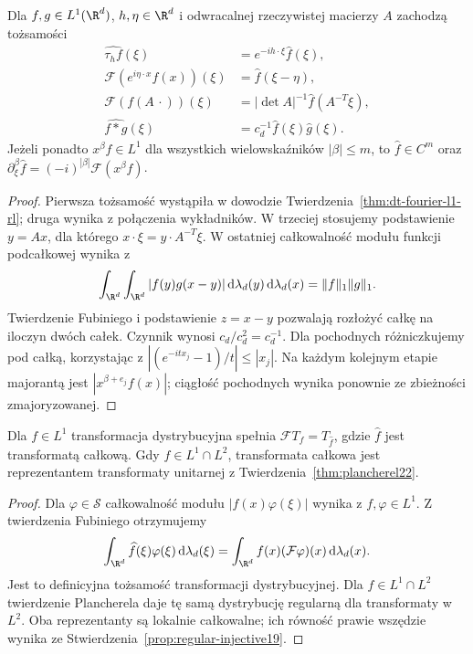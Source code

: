 \begin{stwierdzenie}
\label{prop:dt-fourier-l1-rules}
Dla $f,g\in L^1(\R^d)$, $h,\eta\in\R^d$ i odwracalnej
rzeczywistej macierzy $A$ zachodzą tożsamości
\[
\begin{aligned}
 \widehat{\tau_h f}(\xi)&=e^{-ih\cdot\xi}\widehat f(\xi),\\
 \mathcal F(e^{i\eta\cdot x}f(x))(\xi)&=\widehat f(\xi-\eta),\\
 \mathcal F(f(A\,\cdot))(\xi)&=
 |\det A|^{-1}\widehat f(A^{-T}\xi),\\
 \widehat{f*g}(\xi)&=c_d^{-1}\widehat f(\xi)\widehat g(\xi).
\end{aligned}
\]
Jeżeli ponadto $x^\beta f\in L^1$ dla wszystkich
wielowskaźników $|\beta|\le m$, to $\widehat f\in C^m$
oraz $\partial_\xi^\beta\widehat f=(-i)^{|\beta|}
\mathcal F(x^\beta f)$.
\end{stwierdzenie}
\begin{proof}
Pierwsza tożsamość wystąpiła w dowodzie
Twierdzenia~\ref{thm:dt-fourier-l1-rl}; druga wynika z
połączenia wykładników. W trzeciej stosujemy podstawienie
$y=Ax$, dla którego $x\cdot\xi=y\cdot A^{-T}\xi$.
W ostatniej całkowalność modułu funkcji podcałkowej
wynika z
\[
 \int_{\R^d}\int_{\R^d}|f(y)g(x-y)|
 \,\mathrm d\lambda_d(y)\,\mathrm d\lambda_d(x)
 =\|f\|_1\|g\|_1.
\]
Twierdzenie Fubiniego i podstawienie $z=x-y$ pozwalają
rozłożyć całkę na iloczyn dwóch całek. Czynnik wynosi
$c_d/c_d^2=c_d^{-1}$.
Dla pochodnych różniczkujemy pod całką, korzystając z
$|(e^{-itx_j}-1)/t|\le |x_j|$. Na każdym kolejnym etapie
majorantą jest $|x^{\beta+e_j}f(x)|$; ciągłość
pochodnych wynika ponownie ze zbieżności zmajoryzowanej.
\end{proof}

\begin{stwierdzenie}
\label{prop:dt-fourier-l1-l2-compat}
Dla $f\in L^1$ transformacja dystrybucyjna spełnia
$\mathcal FT_f=T_{\widehat f}$, gdzie $\widehat f$
jest transformatą całkową. Gdy $f\in L^1\cap L^2$,
transformata całkowa jest reprezentantem transformaty
unitarnej z Twierdzenia~\ref{thm:plancherel22}.
\end{stwierdzenie}
\begin{proof}
Dla $\varphi\in\mathcal S$ całkowalność modułu
$|f(x)\varphi(\xi)|$ wynika z $f,\varphi\in L^1$.
Z twierdzenia Fubiniego otrzymujemy
\[
 \int_{\R^d}\widehat f(\xi)\varphi(\xi)\,\mathrm d\lambda_d(\xi)
 =\int_{\R^d}f(x)(\mathcal F\varphi)(x)\,\mathrm d\lambda_d(x).
\]
Jest to definicyjna tożsamość transformacji dystrybucyjnej.
Dla $f\in L^1\cap L^2$ twierdzenie Plancherela daje
tę samą dystrybucję regularną dla transformaty w $L^2$.
Oba reprezentanty są lokalnie całkowalne; ich równość
prawie wszędzie wynika ze
Stwierdzenia~\ref{prop:regular-injective19}.
\end{proof}

